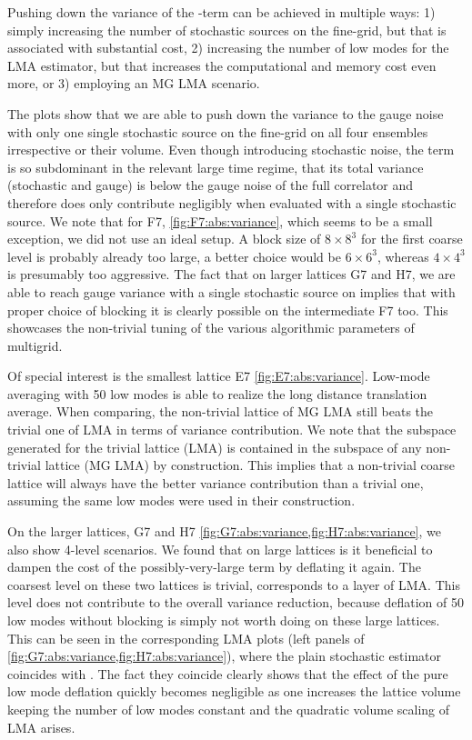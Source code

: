 Pushing down the variance of the -term can be achieved in multiple ways:
1) simply increasing the number of stochastic sources on the fine-grid, but that is associated with substantial cost,
2) increasing the number of low modes for the LMA estimator, but that increases the computational and memory cost even more,
or 3) employing an MG LMA scenario.

The plots show that we are able to push down the  variance to the gauge noise with only one single stochastic source on the fine-grid on all four ensembles irrespective or their volume.
Even though introducing stochastic noise, the  term is so subdominant in the relevant large time regime, that its total variance (stochastic and gauge) is below the gauge noise of the full correlator and therefore does only contribute negligibly when evaluated with a single stochastic source.
We note that for F7, \cref{fig:F7:abs:variance}, which seems to be a small exception, we did not use an ideal setup.
A block size of $8 \times 8^{3}$ for the first coarse level  is probably already too large, a better choice would be $6 \times 6^{3}$, whereas $4 \times 4^{3}$ is presumably too aggressive.
The fact that on larger lattices G7 and H7, we are able to reach gauge variance with a single stochastic source on  implies that with proper choice of blocking it is clearly possible on the intermediate F7 too.
This showcases the non-trivial tuning of the various algorithmic parameters of multigrid.

Of special interest is the smallest lattice E7 \cref{fig:E7:abs:variance}.
Low-mode averaging with \num{50} low modes is able to realize the long distance translation average.
When comparing, the non-trivial lattice of MG LMA still beats the trivial one of LMA in terms of variance contribution.
We note that the subspace generated for the trivial lattice (LMA) is contained in the subspace of any non-trivial lattice (MG LMA) by construction.
This implies that a non-trivial coarse lattice will always have the better variance contribution than a trivial one, assuming the same low modes were used in their construction.

On the larger lattices, G7 and H7 \cref{fig:G7:abs:variance,fig:H7:abs:variance}, we also show 4-level scenarios.
We found that on large lattices is it beneficial to dampen the cost of the possibly-very-large  term by deflating it again.
The coarsest level on these two lattices is trivial, \ie corresponds to a layer of LMA.
This level does not contribute to the overall variance reduction, because deflation of \num{50} low modes without blocking is simply not worth doing on these large lattices.
This can be seen in the corresponding LMA plots (left panels of \cref{fig:G7:abs:variance,fig:H7:abs:variance}), where the plain stochastic estimator coincides with .
The fact they coincide clearly shows that the effect of the pure low mode deflation quickly becomes negligible as one increases the lattice volume keeping the number of low modes constant and the quadratic volume scaling of LMA arises.


